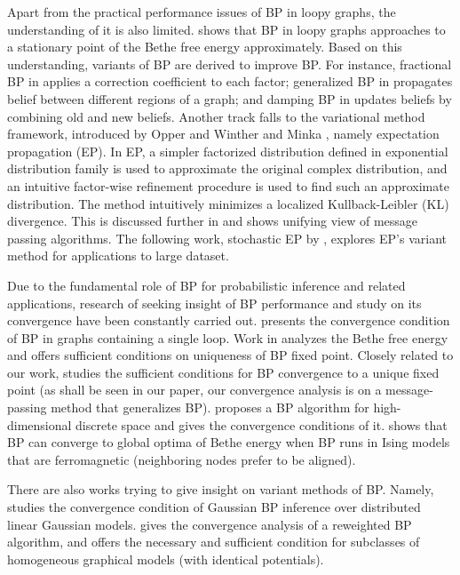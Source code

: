 Apart from the practical performance issues of BP in loopy graphs, the understanding of it is also limited. \cite{Yedidia:2000:GBP:3008751.3008848} shows that BP in loopy graphs approaches to a stationary point of the Bethe free energy approximately. Based on this understanding, variants of BP are derived to improve BP. For instance, fractional BP in \cite{Wiegerinck:2002:FBP:2968618.2968673} applies a correction coefficient to each factor; generalized BP in \cite{Yedidia:2000:GBP:3008751.3008848} propagates belief between different regions of a graph; and damping BP in \cite{Pretti2005damping} updates beliefs by combining old and new beliefs. Another track falls to the variational method framework, introduced by Opper and Winther \cite{Opper:2000:GPC:1121900.1121911} and Minka \cite{Minka:2001:EPA:647235.720257, Minka:2001:FAA:935427}, namely expectation propagation (EP). In EP, a simpler factorized distribution defined in exponential distribution family is used to approximate the original complex distribution, and an intuitive factor-wise refinement procedure is used to find such an approximate distribution. The method intuitively minimizes a localized Kullback-Leibler (KL) divergence. This is discussed further in \cite{divergence-measures-and-message-passing} and  shows unifying view of message passing algorithms. The following work, stochastic EP by \cite{yingzhen2015sep}, explores EP's variant method for applications to large dataset.

Due to the fundamental role of BP for probabilistic inference and related applications, research of seeking insight of BP performance and study on its convergence have been constantly carried out.  \cite{weiss2000correctness} presents the convergence condition of BP in graphs containing a single loop. Work in \cite{heskes2004uniqueness} analyzes the Bethe free energy and offers sufficient conditions on uniqueness of BP fixed point.
{Closely related to our work, \cite{mooij2012sufficient-conditions} studies the sufficient conditions for BP convergence to a unique fixed point (as shall be seen in our paper, our convergence analysis is on a message-passing method that generalizes BP).}
\cite{nima2013stochasticBP} proposes a BP algorithm for high-dimensional discrete space and gives the convergence conditions of it. \cite{frederic2019fast} shows that BP can converge to global optima of Bethe energy when BP runs in Ising models that are ferromagnetic (neighboring nodes prefer to be aligned).

There are also works trying to give insight on variant methods of BP. Namely,
\cite{du2017convergenceBP,malioutov2006walk-sums} studies the convergence condition of Gaussian BP inference over distributed linear Gaussian models. \cite{roosta2008reweighed_sum_product} gives the convergence analysis of a reweighted BP algorithm, and offers the necessary and sufficient condition for subclasses of homogeneous graphical models (with identical potentials).


